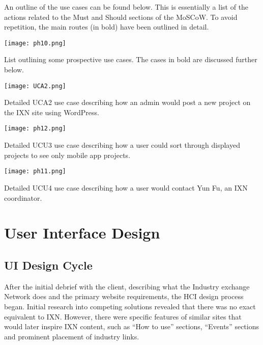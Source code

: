\documentclass[fontsize=11pt]{extarticle}
\numberwithin{figure}{section} %
\numberwithin{table}{section}%
\begin{document}
An outline of the use cases can be found below. This is essentially a
list of the actions related to the Must and Should sections of the
MoSCoW. To avoid repetition, the main routes (in bold) have been
outlined in detail.

\begin{table}[H]
      \centering
      \texttt{[image: ph10.png]}
      \caption{List outlining some prospective use cases. The cases in bold are discussed further below.}
 \end{table}

\begin{table}[H]
      \centering
      \texttt{[image: UCA2.png]}
      \caption{Detailed UCA2 use case describing how an admin would post a new project on the IXN site using WordPress.}
 \end{table}

\begin{table}[H]
      \centering
      \texttt{[image: ph12.png]}
      \caption{Detailed UCU3 use case describing how a user could sort through displayed projects to see only mobile app projects.}
 \end{table}

\begin{table}[H]
      \centering
      \texttt{[image: ph11.png]}
      \caption{Detailed UCU4 use case describing how a user would contact Yun Fu, an IXN coordinator. }
 \end{table}

\newpage

\hypertarget{user-interface-design}{%
\section{User Interface Design}\label{user-interface-design}}

\hypertarget{ui-design-cycle}{%
\subsection{UI Design Cycle}\label{ui-design-cycle}}

After the initial debrief with the client, describing what the Industry
exchange Network does and the primary website requirements, the HCI
design process began. Initial research into competing solutions revealed
that there was no exact equivalent to IXN. However, there were specific
features of similar sites that would later inspire IXN content, such as
``How to use'' sections, ``Events'' sections and prominent placement of
industry links.
\end{document}
